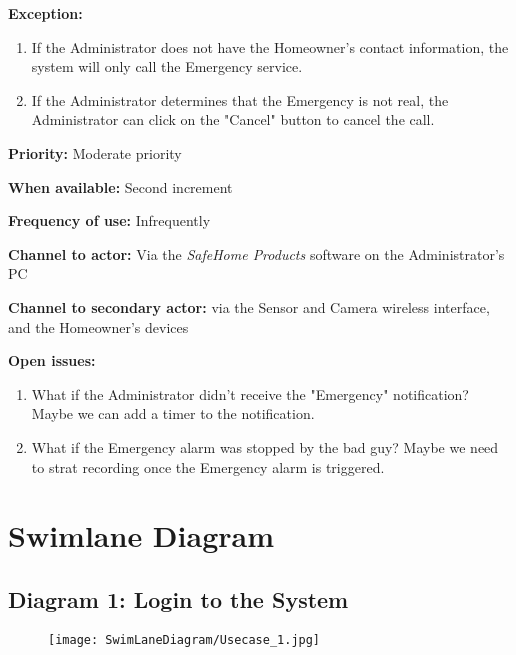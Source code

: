 \documentclass[twoside,11pt]{article}
\begin{document}
\begin{center}
{{\begin{multicols}{2}
                \textbf{Exception:}

                \begin{enumerate}
                    \item If the Administrator does not have the Homeowner's contact information, the system will only call the Emergency service.
                    \item If the Administrator determines that the Emergency is not real, the Administrator can click on the "Cancel" button to cancel the call.
                \end{enumerate}

                \textbf{Priority:} Moderate priority

                \textbf{When available:} Second increment

                \textbf{Frequency of use:} Infrequently

                \textbf{Channel to actor:} Via the \emph{SafeHome Products} software on the Administrator's PC

                \textbf{Channel to secondary actor:} via the Sensor and Camera wireless interface, and the Homeowner's devices

                \textbf{Open issues:}

                \begin{enumerate}
                    \item What if the Administrator didn't receive the "Emergency" notification? Maybe we can add a timer to the notification.
                    \item What if the Emergency alarm was stopped by the bad guy? Maybe we need to strat recording once the Emergency alarm is triggered.
                \end{enumerate}

            \end{multicols}}}
\end{center}
\newpage

\section{Swimlane Diagram}
\fontsize{11}{12}\selectfont

\subsection{Diagram 1: Login to the System}

\begin{figure}[H]
    \centering
    \texttt{[image: SwimLaneDiagram/Usecase\_1.jpg]}
\end{figure}
\newpage
\end{document}
